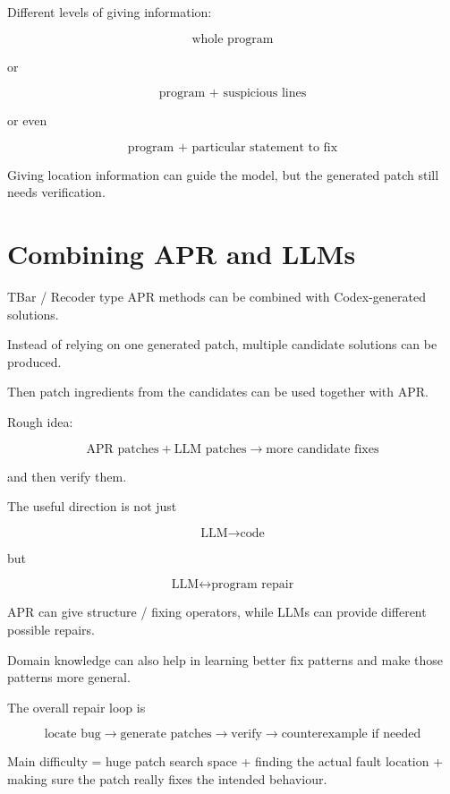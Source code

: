 \documentclass[11pt]{book}
\begin{document}
Different levels of giving information:

\[
\text{whole program}
\]

or

\[
\text{program + suspicious lines}
\]

or even

\[
\text{program + particular statement to fix}
\]

Giving location information can guide the model,
but the generated patch still needs verification.

\section{Combining APR and LLMs}

TBar / Recoder type APR methods can be combined
with Codex-generated solutions.

Instead of relying on one generated patch,
multiple candidate solutions can be produced.

Then patch ingredients from the candidates can be
used together with APR.

Rough idea:

\[
\text{APR patches}
+
\text{LLM patches}
\rightarrow
\text{more candidate fixes}
\]

and then verify them.

The useful direction is not just

\[
\text{LLM}\rightarrow\text{code}
\]

but

\[
\text{LLM}
\leftrightarrow
\text{program repair}
\]

APR can give structure / fixing operators,
while LLMs can provide different possible repairs.

Domain knowledge can also help in learning better
fix patterns and make those patterns more general.

\begin{ppkey}
The overall repair loop is

\[
\boxed{
\text{locate bug}
\rightarrow
\text{generate patches}
\rightarrow
\text{verify}
\rightarrow
\text{counterexample if needed}
}
\]
\end{ppkey}

Main difficulty = huge patch search space + finding
the actual fault location + making sure the patch
really fixes the intended behaviour.
\end{document}
